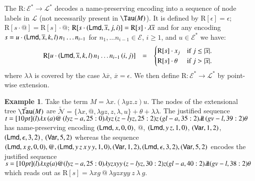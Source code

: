 \documentclass{elsarticle}
\theoremstyle{plain}
\theoremstyle{definition}
\newtheorem{example}{Example}[section]
\newcommand\VarSet{\mathcal{V}}
\newcommand\Nodes{\mathcal{N}}%
\newcommand{\ghostlmd}{{\lambda\!\!\lambda}}
\newcommand{\ghostvar}{\theta}
\newcommand\ExtendedNodes{\tilde{\Nodes}}
\def\readout{\mathrm{R}} %
\def\nameencoding{\mathcal{E}} %
\newcommand{\ctree}{\Tau} %
\newcommand{\exttree}{\tilde{\Tau}} %
\begin{document}
%
The  $\readout: \nameencoding^* \rightarrow \mathcal{L}^*$
decodes a name-preserving encoding into a sequence of node labels in $\mathcal{L}$ (not necessarily present in $\ctree(M)$). It is defined by
$\readout[\epsilon]= \epsilon$;
$\readout[s \cdot @] = \readout[s] \cdot @$;
$\readout[s \cdot ({\sf Lmd}, \overline{x}, j, i) ] = \readout[s] \cdot \lambda\overline{x}$
and for any encoding $s = u \cdot ({\sf Lmd}, \overline{x}, k, l)\,  n_1 \ldots n_{i-1}$ for  $n_1, \ldots n_{i-1}\in \nameencoding$, $i\geq 1$, and $u \in \nameencoding^*$ we have:
$$
\begin{array}{lll}
\readout[u \cdot ({\sf Lmd}, \overline{x}, k, l)\,  n_1 \ldots n_{i-1}\, (i,j)]
&=&
 \begin{cases}
   \readout[s] \cdot x_j &
     \mbox{if $j\leq |\overline{x}|$.} \\
   \readout[s] \cdot \ghostvar &
     \mbox{if $j> |\overline{x}|$.}
\end{cases}
\end{array}$$
where $\ghostlmd$ is covered by the case  $\lambda\overline{x}$, $\overline{x}=\epsilon$.
We then define $\readout \colon \nameencoding^* \rightarrow \mathcal{L}^*$
by point-wise extension.

\begin{example}
\label{examp:ghost_materialization}
    Take the term $M = \lambda x. (\lambda y z.z) u$. The nodes of the extensional tree $\exttree(M)$ are $\ExtendedNodes = \{ \lambda x, @, \lambda y z, z, \lambda, u \} + \ghostvar + \ghostlmd$. The justified sequence
    $t = \Pstr[10pt]{
        (l){\lambda x} \, (a)@ \, (lyz-a,25:0){\lambda y z} \, (z-lyz,25:2)z \, (gl-a,35:2)\ghostlmd \, (gv-l,39:2)\ghostvar }
    $
    has name-preserving encoding
    $({\sf Lmd }, x ,0,0)$,
    $@$,
    $({\sf Lmd }, y\, z, 1,0)$,
    $({\sf Var },1,2)$,
    $({\sf Lmd },\epsilon,3,2)$,
    $({\sf Var },5,2)$
    whereas the sequence
    $ ({\sf Lmd }, x\, g, 0, 0),
    @,
    ({\sf Lmd }, y\, z\, x\, y\, y, 1,0),
    ({\sf Var }, 1,2),
    ({\sf Lmd },\epsilon,3,2),
    ({\sf Var },5,2)$ encodes the justified sequence
    $s= \Pstr[10pt]{
        (l){\lambda x g}
         (a)@
         (lyz-a,25:0){\lambda y z x y y}
         \,(z-lyz,30:2)z
         (gl-a,40:2)\ghostlmd
         (gv-l,38:2)\ghostvar }
    $ which reads out as $\readout[s]= \lambda x g ~ @ ~ \lambda y z x y y ~ z ~ \lambda ~ g$.
\end{example}
\end{document}
